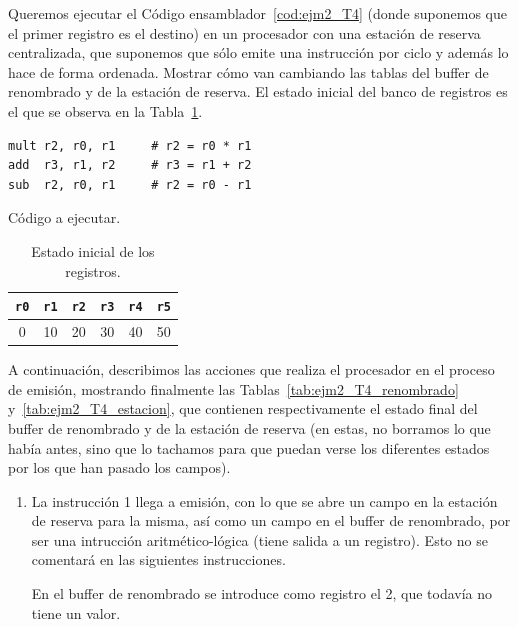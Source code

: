 \begin{ejemplo}
    Queremos ejecutar el Código ensamblador~\ref{cod:ejm2_T4} (donde suponemos que el primer registro es el destino) en un procesador con una estación de reserva centralizada, que suponemos que sólo emite una instrucción por ciclo y además lo hace de forma ordenada. Mostrar cómo van cambiando las tablas del buffer de renombrado y de la estación de reserva. El estado inicial del banco de registros es el que se observa en la Tabla~\ref{tab:ejm2_T4_registros}.\\
    \begin{listing}[H]
    \begin{verbatim}
mult r2, r0, r1     # r2 = r0 * r1     
add  r3, r1, r2     # r3 = r1 + r2
sub  r2, r0, r1     # r2 = r0 - r1
    \end{verbatim}
    \caption{Código a ejecutar.}
    \label{cod:ejm2_T4}
    \end{listing}

    \begin{table}
    \centering
    \begin{tabular}{|c|c|c|c|c|c|}
        \hline
        \verb|r0| & \verb|r1| & \verb|r2| & \verb|r3| & \verb|r4| & \verb|r5| \\ 
        \hline
        0 & 10 & 20 & 30 & 40 & 50 \\
        \hline
    \end{tabular}
    \caption{Estado inicial de los registros.}
    \label{tab:ejm2_T4_registros}
    \end{table}

    A continuación, describimos las acciones que realiza el procesador en el proceso de emisión, mostrando finalmente las Tablas~\ref{tab:ejm2_T4_renombrado} y~\ref{tab:ejm2_T4_estacion}, que contienen respectivamente el estado final del buffer de renombrado y de la estación de reserva (en estas, no borramos lo que había antes, sino que lo tachamos para que puedan verse los diferentes estados por los que han pasado los campos).
    \begin{enumerate}
        \item La instrucción 1 llega a emisión, con lo que se abre un campo en la estación de reserva para la misma, así como un campo en el buffer de renombrado, por ser una intrucción aritmético-lógica (tiene salida a un registro). Esto no se comentará en las siguientes instrucciones.

            En el buffer de renombrado se introduce como registro el 2, que todavía no tiene un valor.


\end{enumerate}
\end{ejemplo}
